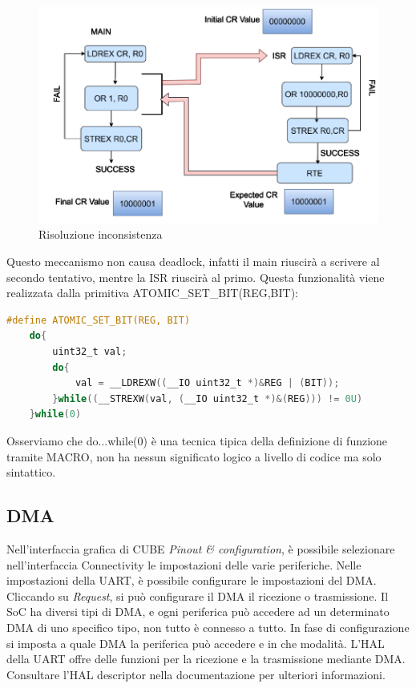 \begin{figure}[ht]
    \centering
    \includegraphics[width=.7\textwidth]{img/conflict_example_2.png}
    \caption{Risoluzione inconsistenza}
    \label{img:w_conflict_resolve}
\end{figure}

Questo meccanismo non causa deadlock, infatti il main riuscirà a scrivere al secondo tentativo, mentre la ISR riuscirà al primo. 
Questa funzionalità viene realizzata dalla primitiva ATOMIC\_SET\_BIT(REG,BIT):

\begin{lstlisting}[language=C]
    #define ATOMIC_SET_BIT(REG, BIT)
    do{
        uint32_t val;
        do{
            val = __LDREXW((__IO uint32_t *)&REG | (BIT));
        }while((__STREXW(val, (__IO uint32_t *)&(REG))) != 0U)
    }while(0)
\end{lstlisting}

Osserviamo che do{...}while(0) è una tecnica tipica della definizione di funzione tramite MACRO, non ha nessun significato logico a livello di codice ma solo sintattico. 


\subsection{DMA}
Nell'interfaccia grafica di CUBE \textit{Pinout \& configuration}, è possibile selezionare nell'interfaccia Connectivity le impostazioni delle varie periferiche.
Nelle impostazioni della UART, è possibile configurare le impostazioni del DMA. 
Cliccando su \textit{Request}, si può configurare il DMA il ricezione o trasmissione. Il SoC ha diversi tipi di DMA, e ogni periferica può accedere ad un determinato DMA di uno specifico tipo, non tutto è connesso a tutto. In fase di configurazione si imposta a quale DMA la periferica può accedere e in che modalità. 
L'HAL della UART offre delle funzioni per la ricezione e la trasmissione mediante DMA. Consultare l'HAL descriptor nella documentazione per ulteriori informazioni. 
